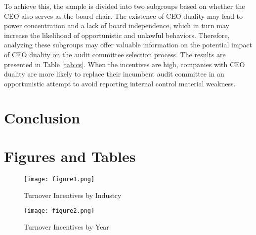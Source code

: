 \documentclass[12pt,english]{article}
\begin{document}
To achieve this, the sample is divided into two subgroups based on whether the CEO also serves as the board chair. The existence of CEO duality may lead to power concentration and a lack of board independence, which in turn may increase the likelihood of opportunistic and unlawful behaviors. Therefore, analyzing these subgroups may offer valuable information on the potential impact of CEO duality on the audit committee selection process. The results are presented in Table \ref{tab:cs}. When the incentives are high, companies with CEO duality are more likely to replace their incumbent audit committee in an opportunistic attempt to avoid reporting internal control material weakness.



\section{Conclusion}\label{sec:conclusion}


\vfill
\pagebreak{}
\begin{spacing}{1.0}


\end{spacing}

\vfill
\pagebreak{}
\clearpage

\section*{Figures and Tables}\label{sec:figTables}
\begin{figure}[ht]
\centering
\bigskip{}
\texttt{[image: figure1.png]}
\caption{Turnover Incentives by Industry}
\label{fig:fig1}
\end{figure}

\begin{figure}[ht]
\centering
\texttt{[image: figure2.png]}
\caption{Turnover Incentives by Year}
\label{fig:fig2}
\end{figure}
\end{document}
